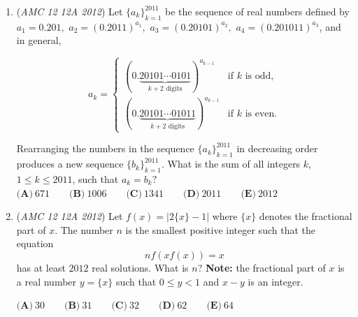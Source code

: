 \begin{enumerate}
	\item (\textit{AMC 12 12A 2012}) Let $\{a_k\}_{k=1}^{2011}$ be the sequence of real numbers defined by $a_1=0.201,$ $a_2=(0.2011)^{a_1},$ $a_3=(0.20101)^{a_2},$ $a_4=(0.201011)^{a_3}$, and in general, 


 
 \[a_k=\begin{cases} (0.\underbrace{20101\cdots 0101}_{k+2\text{ digits}})^{a_{k-1}} & \text{if }k\text{ is odd,}\\ (0.\underbrace{20101\cdots 01011}_{k+2\text{ digits}})^{a_{k-1}}& \text{if }k\text{ is even.} \end{cases}\]


 Rearranging the numbers in the sequence  $\{a_k\}_{k=1}^{2011}$ in decreasing order produces a new sequence  $\{b_k\}_{k=1}^{2011}$.  What is the sum of all integers $k$, $1\le k \le 2011$, such that $a_k=b_k?$
$\textbf{(A)}\ 671\qquad\textbf{(B)}\ 1006\qquad\textbf{(C)}\ 1341\qquad\textbf{(D)}\ 2011\qquad\textbf{(E)}\ 2012$


	\item (\textit{AMC 12 12A 2012}) Let $f(x)=|2\{x\}-1|$ where $\{x\}$ denotes the fractional part of $x$.  The number $n$ is the smallest positive integer such that the equation 
 \[nf(xf(x))=x\] has at least $2012$ real solutions.  What is $n$?  \textbf{Note:} the fractional part of $x$ is a real number $y=\{x\}$ such that $0\le y<1$ and $x-y$ is an integer.


 $\textbf{(A)}\ 30\qquad\textbf{(B)}\ 31\qquad\textbf{(C)}\ 32\qquad\textbf{(D)}\ 62\qquad\textbf{(E)}\ 64$


\end{enumerate}